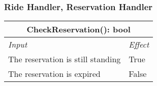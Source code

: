 		
		
		\subsubsection*{Ride Handler, Reservation Handler}
			\begin{tabular}{ |l|l| }
				\hline
				\multicolumn{2}{|c|}{CheckReservation(): bool}\\
				\hline
				\textit{Input} & \textit{Effect}\\ \hline
				The reservation is still standing & True\\ \hline
				The reservation is expired & False\\ \hline
			\end{tabular}
			\\